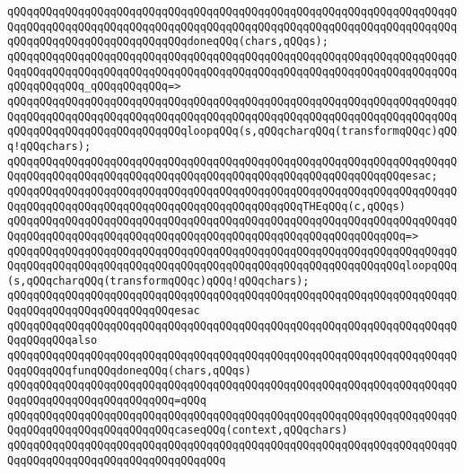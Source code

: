 \verb|qQQqqQQqqQQqqQQqqQQqqQQqqQQqqQQqqQQqqQQqqQQqqQQqqQQqqQQqqQQqqQQqqQQqqQQqqQQqqQQqqQQqqQQqqQQqqQQqqQQqqQQqqQQqqQQqqQQqqQQqqQQqqQQqqQQqqQQqqQQqqQQqqQQqqQQqqQQqqQQqqQQqqQQqdoneqQQq(chars,qQQqs);|\newline
\newline
\verb|qQQqqQQqqQQqqQQqqQQqqQQqqQQqqQQqqQQqqQQqqQQqqQQqqQQqqQQqqQQqqQQqqQQqqQQqqQQqqQQqqQQqqQQqqQQqqQQqqQQqqQQqqQQqqQQqqQQqqQQqqQQqqQQqqQQqqQQqqQQqqQQqqQQqqQQq_qQQqqQQqqQQq=>|\newline
\verb|qQQqqQQqqQQqqQQqqQQqqQQqqQQqqQQqqQQqqQQqqQQqqQQqqQQqqQQqqQQqqQQqqQQqqQQqqQQqqQQqqQQqqQQqqQQqqQQqqQQqqQQqqQQqqQQqqQQqqQQqqQQqqQQqqQQqqQQqqQQqqQQqqQQqqQQqqQQqqQQqqQQqqQQqloopqQQq(s,qQQqcharqQQq(transformqQQqc)qQQq!qQQqchars);|\newline
\verb|qQQqqQQqqQQqqQQqqQQqqQQqqQQqqQQqqQQqqQQqqQQqqQQqqQQqqQQqqQQqqQQqqQQqqQQqqQQqqQQqqQQqqQQqqQQqqQQqqQQqqQQqqQQqqQQqqQQqqQQqqQQqqQQqqQQqesac;|\newline
\newline
\verb|qQQqqQQqqQQqqQQqqQQqqQQqqQQqqQQqqQQqqQQqqQQqqQQqqQQqqQQqqQQqqQQqqQQqqQQqqQQqqQQqqQQqqQQqqQQqqQQqqQQqqQQqqQQqqQQqqQQqTHEqQQq(c,qQQqs)|\newline
\verb|qQQqqQQqqQQqqQQqqQQqqQQqqQQqqQQqqQQqqQQqqQQqqQQqqQQqqQQqqQQqqQQqqQQqqQQqqQQqqQQqqQQqqQQqqQQqqQQqqQQqqQQqqQQqqQQqqQQqqQQqqQQqqQQqqQQq=>|\newline
\verb|qQQqqQQqqQQqqQQqqQQqqQQqqQQqqQQqqQQqqQQqqQQqqQQqqQQqqQQqqQQqqQQqqQQqqQQqqQQqqQQqqQQqqQQqqQQqqQQqqQQqqQQqqQQqqQQqqQQqqQQqqQQqqQQqqQQqloopqQQq(s,qQQqcharqQQq(transformqQQqc)qQQq!qQQqchars);|\newline
\verb|qQQqqQQqqQQqqQQqqQQqqQQqqQQqqQQqqQQqqQQqqQQqqQQqqQQqqQQqqQQqqQQqqQQqqQQqqQQqqQQqqQQqqQQqqQQqqQQqesac|\newline
\newline
\verb|qQQqqQQqqQQqqQQqqQQqqQQqqQQqqQQqqQQqqQQqqQQqqQQqqQQqqQQqqQQqqQQqqQQqqQQqqQQqqQQqalso|\newline
\verb|qQQqqQQqqQQqqQQqqQQqqQQqqQQqqQQqqQQqqQQqqQQqqQQqqQQqqQQqqQQqqQQqqQQqqQQqqQQqqQQqfunqQQqdoneqQQq(chars,qQQqs)|\newline
\verb|qQQqqQQqqQQqqQQqqQQqqQQqqQQqqQQqqQQqqQQqqQQqqQQqqQQqqQQqqQQqqQQqqQQqqQQqqQQqqQQqqQQqqQQqqQQqqQQq=qQQq|\newline
\verb|qQQqqQQqqQQqqQQqqQQqqQQqqQQqqQQqqQQqqQQqqQQqqQQqqQQqqQQqqQQqqQQqqQQqqQQqqQQqqQQqqQQqqQQqqQQqqQQqcaseqQQq(context,qQQqchars)|\newline
\verb|qQQqqQQqqQQqqQQqqQQqqQQqqQQqqQQqqQQqqQQqqQQqqQQqqQQqqQQqqQQqqQQqqQQqqQQqqQQqqQQqqQQqqQQqqQQqqQQqqQQqqQQq|\newline
